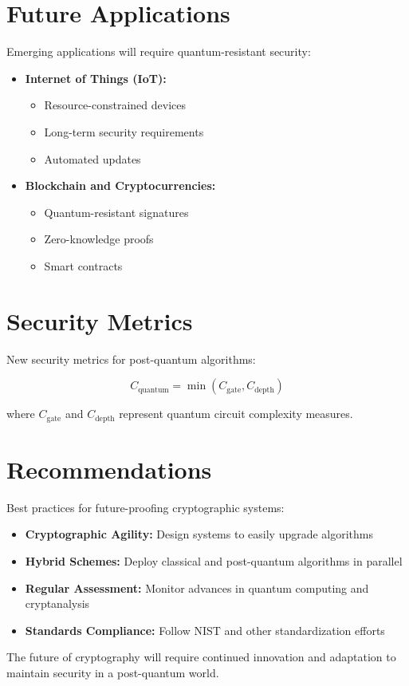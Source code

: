 \section{Future Applications}\label{sec:applications}

Emerging applications will require quantum-resistant security:

\begin{itemize}
    \item \textbf{Internet of Things (IoT):}
    \begin{itemize}
        \item Resource-constrained devices
        \item Long-term security requirements
        \item Automated updates
    \end{itemize}
    \item \textbf{Blockchain and Cryptocurrencies:}
    \begin{itemize}
        \item Quantum-resistant signatures
        \item Zero-knowledge proofs
        \item Smart contracts
    \end{itemize}
\end{itemize}

\section{Security Metrics}\label{sec:metrics}

New security metrics for post-quantum algorithms:

\begin{equation}\label{eq:quantum_cost}
    C_{\text{quantum}} = \min(C_{\text{gate}}, C_{\text{depth}})
\end{equation}

where $C_{\text{gate}}$ and $C_{\text{depth}}$ represent quantum circuit complexity measures.

\section{Recommendations}\label{sec:future_recommendations}

Best practices for future-proofing cryptographic systems:

\begin{itemize}
    \item \textbf{Cryptographic Agility:} Design systems to easily upgrade algorithms
    \item \textbf{Hybrid Schemes:} Deploy classical and post-quantum algorithms in parallel
    \item \textbf{Regular Assessment:} Monitor advances in quantum computing and cryptanalysis
    \item \textbf{Standards Compliance:} Follow NIST and other standardization efforts
\end{itemize}

The future of cryptography will require continued innovation and adaptation to maintain security in a post-quantum world.